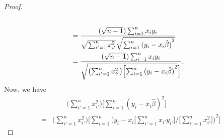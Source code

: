 \begin{itemize}
\begin{proof}
\begin{equation*}
\begin{split}
{                        } \\
                    &= \frac{(\sqrt{n - 1})\sum_{i=1}^n x_i y_i}
                        {
                            \sqrt{\sum_{i'=1}^n x_{i'}^2}
                            \sqrt{\sum_{i=1}^n {(y_i - x_i\hat{\beta})}^2}
                        } \\
                    &= \frac{(\sqrt{n - 1})\sum_{i=1}^n x_i y_i}
                        {
                            \sqrt{\bigl(\sum_{i'=1}^n x_{i'}^2\bigr)
                            \Bigl[\sum_{i=1}^n {(y_i - x_i\hat{\beta})}^2}\Bigr]
                        }.
                \end{split}
            \end{equation*}
            Now, we have
            \begin{equation*}
                \begin{split}
                    &\qquad \Biggl(\sum_{i'=1}^n x_{i'}^2\Biggr)
                    \Biggl[\sum_{i=1}^n {(y_i - x_i\hat{\beta})}^2\Biggr] \\
                    = &\Biggl(\sum_{i'=1}^n x_{i'}^2\Biggr) 
                    \Biggl[\sum_{i=1}^n {\Biggl(y_i - x_i 
                        \Biggl[\sum_{i'=1}^n x_{i'}y_{i'}\Biggr] / 
                        \Biggl[\sum_{i'=1}^n x_{i'}^2\Biggr]\Biggr)}^2
                    \Biggr]
                \end{split}
            \end{equation*}
        \end{proof}
\end{itemize}
